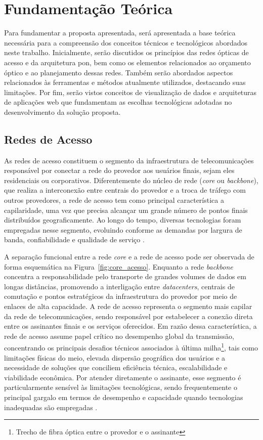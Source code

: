 \chapter{Fundamentação Teórica}

Para fundamentar a proposta apresentada, será apresentada a base teórica necessária para a compreensão dos conceitos técnicos e tecnológicos abordados neste trabalho. Inicialmente, serão discutidos os princípios das redes ópticas de acesso e da arquitetura \gls{pon}, bem como os elementos relacionados ao orçamento óptico e ao planejamento dessas redes. Também serão abordados aspectos relacionados às ferramentas e métodos atualmente utilizados, destacando suas limitações. Por fim, serão vistos conceitos de visualização de dados e arquiteturas de aplicações web que fundamentam as escolhas tecnológicas adotadas no desenvolvimento da solução proposta. 

\section{Redes de Acesso}

As redes de acesso constituem o segmento da infraestrutura de telecomunicações responsável por conectar a rede do provedor aos usuários finais, sejam eles residenciais ou corporativos. Diferentemente do núcleo de rede (\textit{core} ou \textit{backbone}), que realiza a interconexão entre centrais do provedor e a troca de tráfego com outros provedores, a rede de acesso tem como principal característica a capilaridade, uma vez que precisa alcançar um grande número de pontos finais distribuídos geograficamente. Ao longo do tempo, diversas tecnologias foram empregadas nesse segmento, evoluindo conforme as demandas por largura de banda, confiabilidade e qualidade de serviço \cite{tanenbaum2011networks}.

A separação funcional entre a rede \textit{core} e a rede de acesso pode ser observada de forma esquemática na Figura~\ref{fig:core_acesso}. Enquanto a rede \textit{backbone} concentra a responsabilidade pelo transporte de grandes volumes de dados em longas distâncias, promovendo a interligação entre \textit{datacenters}, centrais de comutação e pontos estratégicos da infraestrutura do provedor por meio de enlaces de alta capacidade. A rede de acesso representa o segmento mais capilar da rede de telecomunicações, sendo responsável por estabelecer a conexão direta entre os assinantes finais e os serviços oferecidos. Em razão dessa característica, a rede de acesso assume papel crítico no desempenho global da transmissão, concentrando os principais desafios técnicos associados à última milha\footnote{Trecho de fibra óptica entre o provedor e o assinante}, tais como limitações físicas do meio, elevada dispersão geográfica dos usuários e a necessidade de soluções que conciliem eficiência técnica, escalabilidade e viabilidade econômica. Por atender diretamente o assinante, esse segmento é particularmente sensível às limitações tecnológicas, sendo frequentemente o principal gargalo em termos de desempenho e capacidade quando tecnologias inadequadas são empregadas \cite{tanenbaum2011networks}.

